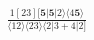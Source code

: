 \documentclass[varwidth, border=5pt]{standalone}
\begin{document}
\begin{my}
$\begin{gathered}
\scriptscriptstyle\frac{1[23][𝟓|𝟓|2⟩⟨4𝟓⟩}{⟨12⟩⟨23⟩⟨2|3+4|2]}
\end{gathered}$
\end{my}
\end{document}
